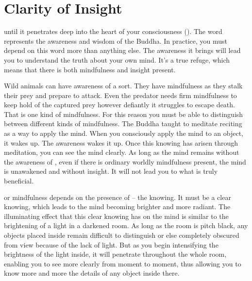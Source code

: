 
\chapter{Clarity of Insight}

\vspace*{0.5\baselineskip}
  until it penetrates deep into the heart of your consciousness (). The word  represents the awareness and wisdom of the Buddha. In practice, you must depend on this word more than anything else. The awareness it brings will lead you to understand the truth about your own mind. It's a true refuge, which means that there is both mindfulness and insight present.

Wild animals can have awareness of a sort. They have mindfulness as they stalk their prey and prepare to attack. Even the predator needs firm mindfulness to keep hold of the captured prey however defiantly it struggles to escape death. That is one kind of mindfulness. For this reason you must be able to distinguish between different kinds of mindfulness. The Buddha taught to meditate reciting  as a way to apply the mind. When you consciously apply the mind to an object, it wakes up. The awareness wakes it up. Once this knowing has arisen through meditation, you can see the mind clearly. As long as the mind remains without the awareness of , even if there is ordinary worldly mindfulness present, the mind is unawakened and without insight. It will not lead you to what is truly beneficial.

 or mindfulness depends on the presence of  -- the knowing. It must be a clear knowing, which leads to the mind becoming brighter and more radiant. The illuminating effect that this clear knowing has on the mind is similar to the brightening of a light in a darkened room. As long as the room is pitch black, any objects placed inside remain difficult to distinguish or else completely obscured from view because of the lack of light. But as you begin intensifying the brightness of the light inside, it will penetrate throughout the whole room, enabling you to see more clearly from moment to moment, thus allowing you to know more and more the details of any object inside there.

